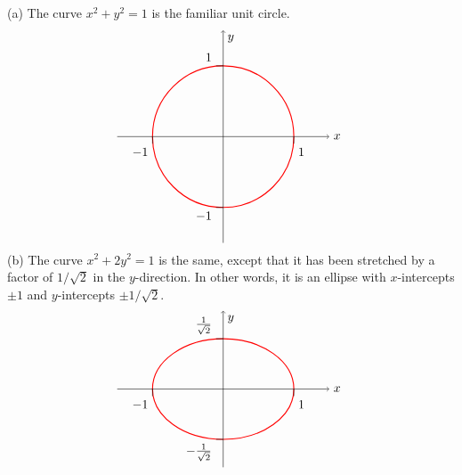 \begin{solution}
  (a) The curve $x^2+y^2=1$ is the familiar unit circle.
  \begin{equation*}
    \begin{tikzpicture}[scale=2]
      \draw[thick,red] (0,0) circle [radius=1];
      \draw[->] (-1.5,0) -- (1.5,0) node[right] {$x$};
      \draw[->] (0,-1.5) -- (0,1.5) node[below right] {$y$};
      \draw (-1,0) -- +(0,-.1) node[below left] {$-1$};
      \draw (1,0) -- +(0,-.1) node[below right] {$1$};
      \draw (0,-1) -- +(-.1,0) node[below left] {$-1$};
      \draw (0,1) -- +(-.1,0) node[above left] {$1$};
    \end{tikzpicture}
  \end{equation*}
  (b) The curve $x^2+2y^2=1$ is the same, except that it has been
  stretched by a factor of $1/\sqrt{2}$ in the $y$-direction.
  In other words, it is an ellipse with $x$-intercepts $\pm 1$ and
  $y$-intercepts $\pm 1/\sqrt{2}$.
  \begin{equation*}
    \begin{tikzpicture}[scale=2]
      \draw[thick,red,yscale={1/sqrt(2)}] (0,0) circle [radius=1];
      \draw[->] (-1.5,0) -- (1.5,0) node[right] {$x$};
      \draw[->] (0,-1.1) -- (0,1.1) node[below right] {$y$};
      \draw (-1,0) -- +(0,-.1) node[below left] {$-1$};
      \draw (1,0) -- +(0,-.1) node[below right] {$1$};
      \draw (0,{-1/sqrt(2)}) -- +(-.1,0) node[below left] {$-\frac{1}{\sqrt{2}}$};
      \draw (0,{1/sqrt(2)}) -- +(-.1,0) node[above left] {$\frac{1}{\sqrt{2}}$};
    \end{tikzpicture}
  \end{equation*}
\end{solution}

